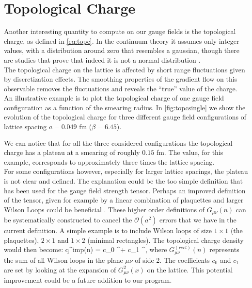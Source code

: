 \section{Topological Charge}
Another interesting quantity to compute on our gauge fields is the topological charge, as defined in \cref{eq:topc}. In the continuum theory it assumes only integer values, with a distribution around zero that resembles a gaussian, though there are studies that prove that indeed it is not a normal distribution \cite{ce_non-gaussianities_2015}. \\
The topological charge on the lattice is affected by short range fluctuations given by discretization effects. The smoothing properties of the gradient flow on this observable removes the fluctuations and reveals the ``true'' value of the charge. An illustrative example is to plot the topological charge of one gauge field configuration as a function of the smearing radius. In \cref{fig:topcsingle} we show the evolution of the topological charge for three different gauge field configurations of lattice spacing $a=0.049$ fm ($\beta=6.45$). 

We can notice that for all the three considered configurations the topological charge has a plateau at a smearing of roughly $0.15$ fm. The value, for this example, corresponds to approximately three times the lattice spacing.\\ 
For some configurations however, especially for larger lattice spacings, the plateau is not clear and defined. The explanation could be the too simple definition that has been used for the gauge field strength tensor. Perhaps an improved definition of the tensor, given for example by a linear combination of plaquettes and larger Wilson Loops could be beneficial \cite{bilson-thompson_highly-improved_2003,alexandrou_comparison_2017}. These higher order definitions of $G_{\mu\nu}(n)$ can be systematically constructed to cancel the $\mathcal{O}(a^2)$ errors that we have in the current definition. A simple example is to include Wilson loops of size $1\times1$ (the plaquettes),  $2\times1$ and $1\times2$ (minimal rectangles). The topological charge density would then become:
\beq
    q^{imp}(n) =  c_0 \epsilon^{\mu\nu\rho\sigma} + c_1 \epsilon^{\mu\nu\rho\sigma},
\eeq
where $G_{\mu\nu}^{(rect)}(n)$ represents the sum of all Wilson loops in the plane $\mu\nu$ of side 2. The coefficients $c_0$ and $c_1$ are set by looking at the expansion of $G_{\mu\nu}^2(x)$ on the lattice. This potential improvement could be a future addition to our program.

